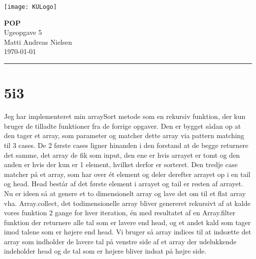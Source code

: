 \documentclass[12pt, a4paper, hidelinks]{article}
\begin{document}
\begin{minipage}[b]{1.0\linewidth}
\texttt{[image: KULogo]}

\vspace*{-16ex}
\begin{center}
    {\Large \bf POP} \vspace*{1ex} \\
    {\large Ugeopgave 5} \vspace*{1ex} \\
    {\large Matti Andreas Nielsen  } \\
    {\large \today{}  }
\end{center}
\vspace*{-3pt}
{\color{KU-red}\hrule}
\end{minipage}
\vspace{2ex}

\tableofcontents \newpage

\section{5i3}
Jeg har implementeret min arraySort metode som en rekursiv funktion, der kun bruger de tilladte funktioner fra de forrige opgaver.
Den er bygget sådan op at den tager et array, som parameter og matcher dette array via pattern matching til 3 cases. 
De 2 første cases ligner hinanden i den forstand at de begge returnere det samme, det array de fik som input, den ene er hvis arrayet er tomt og den anden er hvis der kun er 1 element, hvilket derfor er sorteret.
Den tredje case matcher på et array, som har over ét element og deler derefter arrayet op i en tail og head.
Head består af det første element i arrayet og tail er resten af arrayet.
Nu er ideen så at genere et to dimensionelt array og lave det om til et flat array vha. Array.collect, det todimensionelle array bliver genereret rekursivt af at kalde vores funktion 2 gange for hver iteration, én med resultatet af en Array.filter funktion der returnere alle tal som er lavere end head, og et andet kald som tager imod talene som er højere end head. 
Vi bruger så array indices til at indsætte det array som indholder de lavere tal på venstre side af et array der udelukkende indeholder head og de tal som er højere bliver indsat på højre side. 
\end{document}
